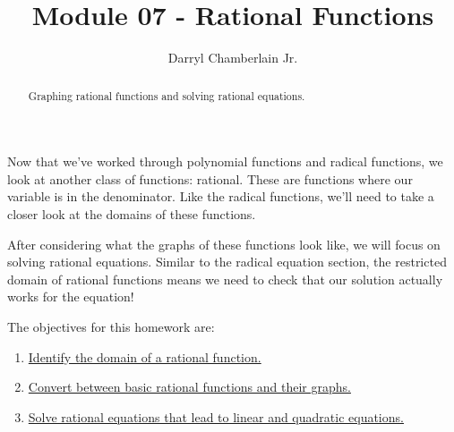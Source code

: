 \documentclass{ximera}
\author{Darryl Chamberlain Jr.}
\title{Module 07 - Rational Functions}
\begin{document}
\begin{abstract}
Graphing rational functions and solving rational equations. 
\end{abstract}
\maketitle

Now that we've worked through polynomial functions and radical functions, we look at another class of functions: rational. These are functions where our variable is in the denominator. Like the radical functions, we'll need to take a closer look at the domains of these functions. 

After considering what the graphs of these functions look like, we will focus on solving rational equations. Similar to the radical equation section, the restricted domain of rational functions means we need to check that our solution actually works for the equation!

The objectives for this homework are: 
\begin{enumerate}
	\item \href{https://cnx.org/contents/mwjClAV_@8.1:KNTP2r7D@13/Rational-Functions}{Identify the domain of a rational function.}
    \item \href{https://cnx.org/contents/mwjClAV_@8.1:KNTP2r7D@13/Rational-Functions}{Convert between basic rational functions and their graphs.}
    \item \href{https://cnx.org/contents/mwjClAV_@8.1:KNTP2r7D@13/Rational-Functions}{Solve rational equations that lead to linear and quadratic equations.}
\end{enumerate}
\end{document}
